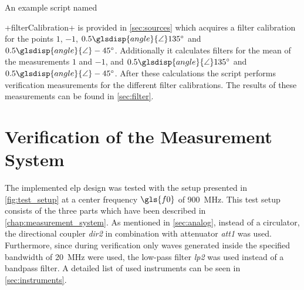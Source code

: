 \documentclass[12pt,a4paper,parskip=full,abstract=true,BCOR=12mm,twoside,open=right]{scrreprt}
\newcommand*{\SavedLstInline}{}
\DeclareRobustCommand*{\lstinline}{%
  \ifmmode
    \let\SavedBGroup\bgroup
    \def\bgroup{%
      \let\bgroup\SavedBGroup
      \hbox\bgroup
    }%
  \fi
  \SavedLstInline
}
\def\device#1{\mbox{\textit{#1}}}
\newcommand{\Angle}{\glsdisp{angle}{\angle}}
\begin{document}
An example script named \lstinline+filterCalibration+ is provided in
\cref{sec:sources} which acquires a filter calibration for the points
$1$, $-1$, $0.5\Angle\SI{135}{\degree}$ and $0.5\Angle\SI{-45}{\degree}$.
Additionally it calculates filters for the mean of the measurements $1$ and $-1$,
and $0.5\Angle\SI{135}{\degree}$ and $0.5\Angle\SI{-45}{\degree}$. After these
calculations the script performs verification measurements for the different
filter calibrations. The results of these measurements can be found in \cref{sec:filter}.


\chapter{Verification of the Measurement System}
\label{chap:verification}
\lstset{language=matlab}

The implemented \gls{elp} design was tested with the setup presented in
\cref{fig:test_setup} at a center frequency $\gls{f0}$ of \SI{900}{\mega\hertz}. This test setup consists of the three parts
which have been described in \cref{chap:measurement_system}. As mentioned in
\cref{sec:analog}, instead of a circulator, the directional coupler
\device{dir2} in combination with attenuator \device{att1} was used.
Furthermore, since during verification only waves generated inside
the specified bandwidth of \SI{20}{\mega\hertz} were used, the low-pass filter \device{lp2}
was used instead of a bandpass filter. A detailed list of used
instruments can be seen in \cref{sec:instruments}.
\end{document}
